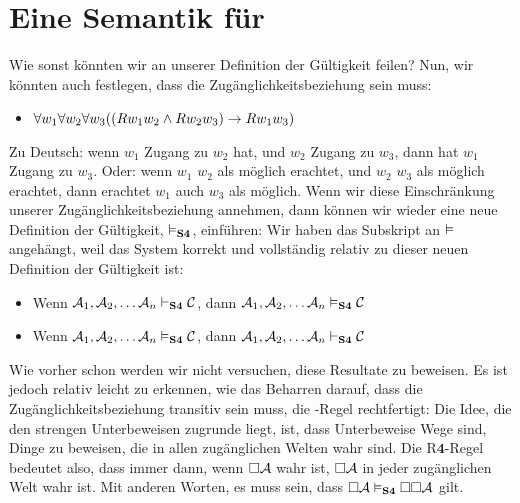 \section{Eine Semantik für \mlSfour}
\label{SemanticsS4}

Wie sonst könnten wir an unserer Definition der Gültigkeit feilen? Nun, wir könnten auch festlegen, dass die Zugänglichkeitsbeziehung  sein muss:
\begin{itemize}
	\item $\forall w_1\forall w_2\forall w_3 ((Rw_1w_2 \wedge Rw_2w_3)\rightarrow Rw_1w_3)$
\end{itemize}
Zu Deutsch: wenn $w_1$ Zugang zu $w_2$ hat, und $w_2$ Zugang zu $w_3$, dann hat $w_1$ Zugang zu $w_3$. Oder: wenn $w_1$ $w_2$ als möglich erachtet, und $w_2$ $w_3$ als möglich erachtet, dann erachtet $w_1$ auch $w_3$ als möglich. Wenn wir diese Einschränkung unserer Zugänglichkeitsbeziehung annehmen, dann können wir wieder eine neue Definition der Gültigkeit, $\vDash_{\mathbf{S4}}$, einführen:
Wir haben das \mlSfour{} Subskript an $\vDash$ angehängt, weil das System \mlSfour{} korrekt und vollständig relativ zu dieser neuen Definition der Gültigkeit ist:
\begin{itemize}
	\item Wenn $\mathcal{A}_1,\mathcal{A}_2, \dots \mathcal{A}_n\vdash_{\mathbf{S4}}\mathcal{C}$, dann $\mathcal{A}_1,\mathcal{A}_2, \dots \mathcal{A}_n\vDash_{\mathbf{S4}}\mathcal{C}$
	\item Wenn $\mathcal{A}_1,\mathcal{A}_2, \dots \mathcal{A}_n\vDash_{\mathbf{S4}}\mathcal{C}$, dann $\mathcal{A}_1,\mathcal{A}_2, \dots \mathcal{A}_n\vdash_{\mathbf{S4}}\mathcal{C}$
\end{itemize}
Wie vorher schon werden wir nicht versuchen, diese Resultate zu beweisen. Es ist jedoch relativ leicht zu erkennen, wie das Beharren darauf, dass die Zugänglichkeitsbeziehung transitiv sein muss, die \mlSfour-Regel rechtfertigt:
Die Idee, die den strengen Unterbeweisen zugrunde liegt, ist, dass Unterbeweise Wege sind, Dinge zu beweisen, die in allen zugänglichen Welten wahr sind. Die R$\mathbf{4}$-Regel bedeutet also, dass immer dann, wenn $\Box \mathcal{A}$ wahr ist, $\Box \mathcal{A}$ in jeder zugänglichen Welt wahr ist. Mit anderen Worten, es muss sein, dass $\Box\mathcal{A} \vDash_{\mathbf{S4}} \Box\Box\mathcal{A}$ gilt.

